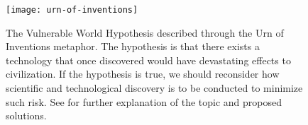 \begin{figure}[h]
  \centering
  \texttt{[image: urn-of-inventions]}
    \caption[The Vulnerable World Hypothesis]{The Vulnerable World Hypothesis described through the Urn of Inventions metaphor. The hypothesis is that there exists a technology that once discovered would have devastating effects to civilization. If the hypothesis is true, we should reconsider how scientific and technological discovery is to be conducted to minimize such risk. See \citep{bostrom2019} for further explanation of the topic and proposed solutions.}
    \label{fig8:vwh}
\end{figure}
